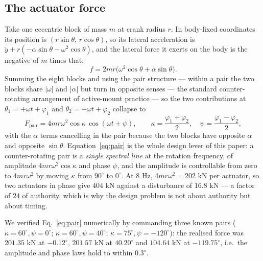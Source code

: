 \documentclass[12pt]{apmcmthesis}
\begin{document}
\subsection{The actuator force}
Take one eccentric block of mass $m$ at crank radius $r$. In body-fixed coordinates its position
is $(r\sin\theta,\,r\cos\theta)$, so its lateral acceleration is
$\ddot y+r(-\alpha\sin\theta-\omega^2\cos\theta)$, and the lateral force it exerts on the body is
the negative of $m$ times that:
\begin{equation}
f=2mr\bigl(\omega^2\cos\theta+\alpha\sin\theta\bigr) .
\label{eq:onelump}
\end{equation}
Summing the eight blocks and using the pair structure --- within a pair the two blocks share
$|\omega|$ and $|\alpha|$ but turn in opposite senses --- the standard counter-rotating
arrangement of active-mount practice \cite{fuller} --- so the two contributions at
$\theta_1=+\omega t+\varphi_1$ and $\theta_2=-\omega t+\varphi_2$ collapse to
\begin{equation}
F_{\text{pair}}=4mr\omega^2\cos\kappa\,\cos(\omega t+\psi),\qquad
\kappa=\frac{\varphi_1+\varphi_2}{2},\quad \psi=\frac{\varphi_1-\varphi_2}{2},
\label{eq:pair}
\end{equation}
with the $\alpha$ terms cancelling in the pair because the two blocks have opposite $\alpha$ and
opposite $\sin\theta$. Equation~\eqref{eq:pair} is the whole design lever of this paper: a
counter-rotating pair is a \emph{single spectral line} at the rotation frequency, of amplitude
$4mr\omega^2\cos\kappa$ and phase $\psi$, and the amplitude is controllable from zero to
$4mr\omega^2$ by moving $\kappa$ from $90^\circ$ to $0^\circ$. At $8$ Hz, $4mr\omega^2=202$ kN per
actuator, so two actuators in phase give $404$ kN against a disturbance of $16.8$ kN --- a factor
of $24$ of authority, which is why the design problem is not about authority but about timing.

We verified Eq.~\eqref{eq:pair} numerically by commanding three known pairs
($\kappa=60^\circ,\psi=0^\circ$; $\kappa=60^\circ,\psi=40^\circ$;
$\kappa=75^\circ,\psi=-120^\circ$): the realised force was $201.35$ kN at $-0.12^\circ$,
$201.57$ kN at $40.20^\circ$ and $104.64$ kN at $-119.75^\circ$, i.e.\ the amplitude and phase laws
hold to within $0.3^\circ$.
\end{document}
